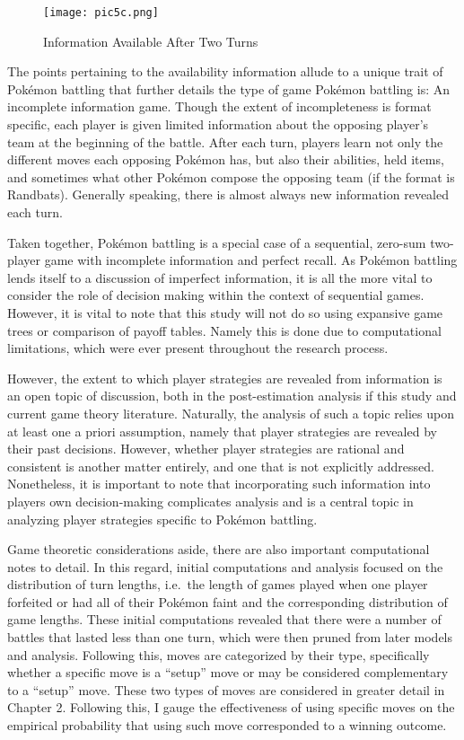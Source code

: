 \documentclass[12pt,twoside]{reedthesis}
\begin{document}
  \begin{figure}[htbp]
  \centering
  \texttt{[image: pic5c.png]}
  \caption{Information Available After Two Turns}
  \end{figure}
  
  The points pertaining to the availability information allude to a unique
  trait of Pokémon battling that further details the type of game Pokémon
  battling is: An incomplete information game. Though the extent of
  incompleteness is format specific, each player is given limited
  information about the opposing player's team at the beginning of the
  battle. After each turn, players learn not only the different moves each
  opposing Pokémon has, but also their abilities, held items, and
  sometimes what other Pokémon compose the opposing team (if the format is
  Randbats). Generally speaking, there is almost always new information
  revealed each turn.
  
  Taken together, Pokémon battling is a special case of a sequential,
  zero-sum two-player game with incomplete information and perfect recall.
  As Pokémon battling lends itself to a discussion of imperfect
  information, it is all the more vital to consider the role of decision
  making within the context of sequential games. However, it is vital to
  note that this study will not do so using expansive game trees or
  comparison of payoff tables. Namely this is done due to computational
  limitations, which were ever present throughout the research process.
  
  However, the extent to which player strategies are revealed from
  information is an open topic of discussion, both in the post-estimation
  analysis if this study and current game theory literature. Naturally,
  the analysis of such a topic relies upon at least one a priori
  assumption, namely that player strategies are revealed by their past
  decisions. However, whether player strategies are rational and
  consistent is another matter entirely, and one that is not explicitly
  addressed. Nonetheless, it is important to note that incorporating such
  information into players own decision-making complicates analysis and is
  a central topic in analyzing player strategies specific to Pokémon
  battling.
  
  Game theoretic considerations aside, there are also important
  computational notes to detail. In this regard, initial computations and
  analysis focused on the distribution of turn lengths, i.e.~the length of
  games played when one player forfeited or had all of their Pokémon faint
  and the corresponding distribution of game lengths. These initial
  computations revealed that there were a number of battles that lasted
  less than one turn, which were then pruned from later models and
  analysis. Following this, moves are categorized by their type,
  specifically whether a specific move is a ``setup'' move or may be
  considered complementary to a ``setup'' move. These two types of moves
  are considered in greater detail in Chapter 2. Following this, I gauge
  the effectiveness of using specific moves on the empirical probability
  that using such move corresponded to a winning outcome.
  
\end{document}
